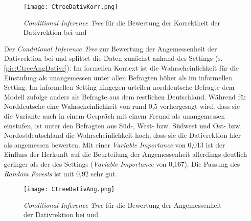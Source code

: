 \begin{figure}
\centering
\texttt{[image: CtreeDativKorr.png]}
\caption{\textit{Conditional Inference Tree} für die Bewertung der Korrektheit der Dativrektion bei \wegen{} und \waehrend}
\label{pic:CtreeKorrDativr}
\end{figure}

Der \textit{Conditional Inference Tree} zur Bewertung der Angemessenheit der Dativrektion bei \wegen{} und \waehrend{} splittet die Daten zunächst anhand des Settings (s. \autoref{pic:CtreeAngDativr}): 
Im formellen Kontext ist die Wahrscheinlichkeit für die Einstufung als unangemessen unter allen Befragten höher als im informellen Setting. 
Im informellen Setting hingegen urteilen norddeutsche Befragte dem Modell zufolge anders als Befragte aus dem restlichen Deutschland. 
Während für Norddeutsche eine Wahrscheinlichkeit von rund 0,5 vorhergesagt wird, dass sie die Variante auch in einem Gespräch mit einem Freund als unangemessen einstufen, ist unter den Befragten aus Süd-, West- bzw. Südwest und Ost- bzw. Nordostdeutschland die Wahrscheinlichkeit hoch, dass sie die Dativrektion hier als angemessen bewerten. 
Mit einer \textit{Variable Importance} von 0,013 ist der Einfluss der Herkunft auf die Beurteilung der Angemessenheit allerdings deutlich geringer als der des Settings (\textit{Variable Importance} von 0,167). 
Die Passung des \textit{Random Forests} ist mit 0,92 sehr gut. 

\begin{figure}
\centering
\texttt{[image: CtreeDativAng.png]}
\caption{\textit{Conditional Inference Tree} für die Bewertung der Angemessenheit der Dativrektion bei \wegen{} und \waehrend}
\label{pic:CtreeAngDativr}
\end{figure}

